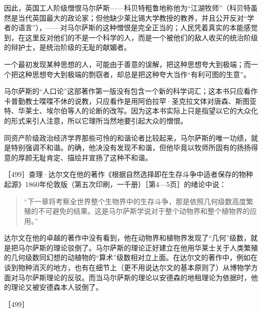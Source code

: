 因此，英国工人阶级憎恨马尔萨斯——科贝特粗鲁地称他为“江湖牧师”（科贝特虽然是当代英国最大的政论家；但他缺少莱比锡大学教授的教养，并且公开反对“学者的语言”），——对马尔萨斯的这种憎恨是完全正当的；人民凭着真实的本能感觉到，在这里反对他们的不是一个科学的人，而是一个被他们的敌人收买的统治阶级的辩护士，是统治阶级的无耻的献媚者。

一个最初发现某种思想的人，可能由于善意的误解，把这种思想夸大到极端；而一个把这种思想夸大到极端的剽窃者，却总是把这种夸大当作“有利可图的生意”。

马尔萨斯的“人口论”这部著作第一版没有包含一个新的科学词汇；这本书只应看作卡普勤教士喋喋不休的说教，只应看作是用阿伯拉罕·圣克拉文体对唐森、斯图亚特、华莱士、埃尔伯等人的论断的改写。因为这本书实际上只是指望以它的大众化的形式来引人注意，所以它理所当然地要引起大众的憎恨。

同资产阶级政治经济学界那些可怜的和谐论者比较起来，马尔萨斯的唯一功绩，就是特别强调不和谐。的确，他决没有发现不和谐，但他毕竟以牧师所固有的扬扬得意的厚颜无耻肯定、描绘并宣扬了这种不和谐。


［499］查理·达尔文在他的著作《根据自然选择即在生存斗争中适者保存的物种起源》1860年伦敦版（第五次印刷，一千册）［第4—5页］的绪论中说：

\begin{quote}{“下一章将考察全世界整个生物界中的生存斗争，那是依照几何级数高度繁殖的不可避免的结果。这是马尔萨斯学说对于整个动物界和整个植物界的应用。”}\end{quote}

达尔文在他的卓越的著作中没有看到，他在动物界和植物界发现了“几何”级数，就是把马尔萨斯的理论驳倒了。马尔萨斯的理论正好建立在他用华莱士关于人类繁殖的几何级数同幻想的动植物的“算术”级数相对立上面。在达尔文的著作中，例如在谈到物种消灭的地方，也有在细节上（更不用说达尔文的基本原则了）从博物学方面对马尔萨斯理论的反驳。而当马尔萨斯的理论以安德森的地租理论为依据时，他的理论又被安德森本人驳倒了。

［499］


